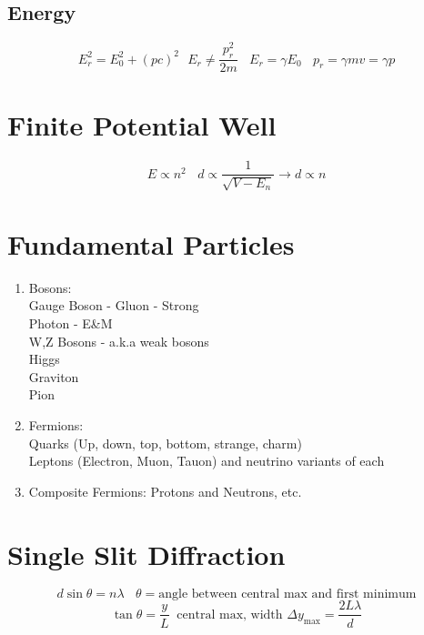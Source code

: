 \documentclass[10pt,a4paper]{article}
\begin{document}
\subsection{Energy} %
\label{sub:energy}
\begin{equation}
    E_r^2 = E_0^2 + (pc)^2~~~E_r \neq \frac{p_r^2}{2m} ~~~~ E_r = \gamma E_0~~~~ p_r = \gamma mv = \gamma p
\end{equation}

\section{Finite Potential Well} %
\label{sec:finite_potential_well}
\begin{equation}
    E \propto n^2 ~~~~ d \propto \frac{1}{\sqrt{V-E_n}} \rightarrow d \propto n
\end{equation}

\section{Fundamental Particles} %
\label{sec:fundamental_particles}
\begin{enumerate}
    \item Bosons:\\
    Gauge Boson - Gluon - Strong\\
    Photon - E\&M\\
    W,Z Bosons - a.k.a weak bosons\\
    Higgs\\
    Graviton\\
    Pion
    \item Fermions:\\
    Quarks (Up, down, top, bottom, strange, charm)\\
    Leptons (Electron, Muon, Tauon) and neutrino variants of each
    \item Composite Fermions: Protons and Neutrons, etc.
\end{enumerate}

\section{Single Slit Diffraction} %
\label{sec:single_slit_diffraction}
\begin{equation}
    d\sin \theta = n\lambda ~~~~ \theta = \textrm{angle between central max and first minimum}
\end{equation}
\begin{equation}
    \tan \theta = \frac{y}{L} ~ \textrm{    central max, width  } \Delta y_{\textrm{max}} = \frac{2 L \lambda}{d}
\end{equation}
\end{document}
